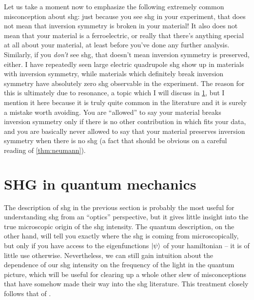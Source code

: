 Let us take a moment now to emphasize the following extremely common misconception about \gls{shg}: just because you see \gls{shg} in your experiment, that does not mean that inversion symmetry is broken in your material!
It also does not mean that your material is a ferroelectric, or really that there's anything special at all about your material, at least before you've done any further analysis.
Similarly, if you \emph{don't} see \gls{shg}, that doesn't mean inversion symmetry is preserved, either.
I have repeatedly seen large electric quadrupole \gls{shg} show up in materials with inversion symmetry, while materials which definitely break inversion symmetry have absolutely zero \gls{shg} observable in the experiment.
The reason for this is ultimately due to resonance, a topic which I will discuss in \cref{sec:resonance}, but I mention it here because it is truly quite common in the literature and it is surely a mistake worth avoiding.
You are ``allowed'' to say your material breaks inversion symmetry only if there is no other contribution in  which fits your data, and you are basically never allowed to say that your material preserves inversion symmetry when there is no \gls{shg} (a fact that should be obvious on a careful reading of \cref{thm:neumann}).

\section{SHG in quantum mechanics}\label{sec:resonance}

The description of \gls{shg} in the previous section is probably the most useful for understanding \gls{shg} from an ``optics'' perspective, but it gives little insight into the true microscopic origin of the \gls{shg} intensity.
The quantum description, on the other hand, will tell you exactly where the \gls{shg} is coming from microscopically, but only if you have access to the eigenfunctions $\ket{\psi}$ of your hamiltonian -- it is of little use otherwise.
Nevertheless, we can still gain intuition about the dependence of our \gls{shg} intensity on the frequency of the light in the quantum picture, which will be useful for clearing up a whole other slew of misconceptions that have somehow made their way into the \gls{shg} literature.
This treatment closely follows that of \citet{boyd}.

